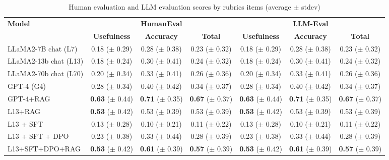 \begin{table}[h!]
\centering
    \caption{Human evaluation and LLM evaluation scores by rubrics items (average $\pm$ stdev)}
    \label{tab:human-llm-eval}
    \begin{tabular}{l|c|c|c|c|c|c}
        \toprule
        \textbf{Model} & \multicolumn{3}{c|}{\textbf{HumanEval}} & \multicolumn{3}{c}{\textbf{LLM-Eval}} \\
        \cmidrule(lr){2-4} \cmidrule(lr){5-7}
        & \textbf{Usefulness} & \textbf{Accuracy} & \textbf{Total} & \textbf{Usefulness} & \textbf{Accuracy} & \textbf{Total} \\
        \midrule
        LLaMA2-7B chat (L7) & 0.18 ($\pm$ 0.29) & 0.28 ($\pm$ 0.38) & 0.23 ($\pm$ 0.32) & 0.18 ($\pm$ 0.29) & 0.28 ($\pm$ 0.38) & 0.23 ($\pm$ 0.32) \\
        LLaMA2-13b chat (L13) & 0.18 ($\pm$ 0.24) & 0.30 ($\pm$ 0.41) & 0.24 ($\pm$ 0.32) & 0.18 ($\pm$ 0.24) & 0.30 ($\pm$ 0.41) & 0.24 ($\pm$ 0.32) \\
        LLaMA2-70b chat (L70) & 0.20 ($\pm$ 0.34) & 0.33 ($\pm$ 0.41) & 0.26 ($\pm$ 0.36) & 0.20 ($\pm$ 0.34) & 0.33 ($\pm$ 0.41) & 0.26 ($\pm$ 0.36) \\
        GPT-4 (G4) & 0.28 ($\pm$ 0.34) & 0.40 ($\pm$ 0.42) & 0.34 ($\pm$ 0.37) & 0.28 ($\pm$ 0.34) & 0.40 ($\pm$ 0.42) & 0.34 ($\pm$ 0.37) \\
        GPT-4+RAG & \textbf{0.63} ($\pm$ 0.44) & \textbf{0.71} ($\pm$ 0.35) & \textbf{0.67} ($\pm$ 0.37) & \textbf{0.63} ($\pm$ 0.44) & \textbf{0.71} ($\pm$ 0.35) & \textbf{0.67} ($\pm$ 0.37) \\
        L13+RAG & \textbf{0.53} ($\pm$ 0.42) & 0.53 ($\pm$ 0.39) & 0.53 ($\pm$ 0.39) & \textbf{0.53} ($\pm$ 0.42) & 0.53 ($\pm$ 0.39) & 0.53 ($\pm$ 0.39) \\
        L13 + SFT & 0.13 ($\pm$ 0.28) & 0.10 ($\pm$ 0.21) & 0.11 ($\pm$ 0.22) & 0.13 ($\pm$ 0.28) & 0.10 ($\pm$ 0.21) & 0.11 ($\pm$ 0.22) \\
        L13 + SFT + DPO & 0.23 ($\pm$ 0.38) & 0.33 ($\pm$ 0.44) & 0.28 ($\pm$ 0.39) & 0.23 ($\pm$ 0.38) & 0.33 ($\pm$ 0.44) & 0.28 ($\pm$ 0.39) \\
        L13+SFT+DPO+RAG & \textbf{0.53} ($\pm$ 0.42) & \textbf{0.61} ($\pm$ 0.39) & \textbf{0.57} ($\pm$ 0.39) & \textbf{0.53} ($\pm$ 0.42) & \textbf{0.61} ($\pm$ 0.39) & \textbf{0.57} ($\pm$ 0.39) \\
        \bottomrule
    \end{tabular}
\end{table}
